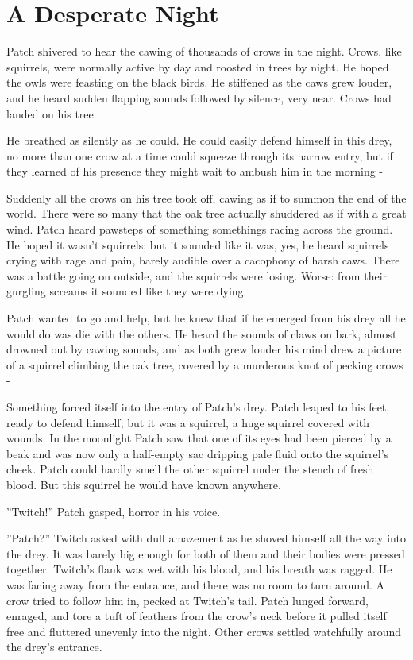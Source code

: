 \documentclass[12pt]{book}
\begin{document}
\section{A Desperate Night}

 Patch shivered to hear the cawing of thousands of crows in the night. Crows, like squirrels, were normally active by day and roosted in trees by night. He hoped the owls were feasting on the black birds. He stiffened as the caws grew louder, and he heard sudden flapping sounds followed by silence, very near. Crows had landed on his tree.\par
He breathed as silently as he could. He could easily defend himself in this drey, no more than one crow at a time could squeeze through its narrow entry, but if they learned of his presence they might wait to ambush him in the morning -\par
 Suddenly all the crows on his tree took off, cawing as if to summon the end of the world. There were so many that the oak tree actually shuddered as if with a great wind. Patch heard pawsteps of something %
 somethings %
 racing across the ground. He hoped it wasn't squirrels; but it sounded like it was, yes, he heard squirrels crying with rage and pain, barely audible over a cacophony of harsh caws. There was a battle going on outside, and the squirrels were losing. Worse: from their gurgling screams it sounded like they were dying.\par
Patch wanted to go and help, but he knew that if he emerged from his drey all he would do was die with the others. He heard the sounds of claws on bark, almost drowned out by cawing sounds, and as both grew louder his mind drew a picture of a squirrel climbing the oak tree, covered by a murderous knot of pecking crows -\par
 Something forced itself into the entry of Patch's drey. Patch leaped to his feet, ready to defend himself; but it was a squirrel, a huge squirrel covered with wounds. In the moonlight Patch saw that one of its eyes had been pierced by a beak and was now only a half-empty sac dripping pale fluid onto the squirrel's cheek. Patch could hardly smell the other squirrel under the stench of fresh blood. But this squirrel he would have known anywhere.\par
 ''Twitch!'' Patch gasped, horror in his voice.\par
 ''Patch?'' Twitch asked with dull amazement as he shoved himself all the way into the drey. It was barely big enough for both of them and their bodies were pressed together. Twitch's flank was wet with his blood, and his breath was ragged. He was facing away from the entrance, and there was no room to turn around. A crow tried to follow him in, pecked at Twitch's tail. Patch lunged forward, enraged, and tore a tuft of feathers from the crow's neck before it pulled itself free and fluttered unevenly into the night. Other crows settled watchfully around the drey's entrance.\par
\end{document}
